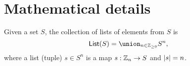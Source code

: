 \documentclass[../notebook.tex]{subfiles}
\begin{document}
\section{Mathematical details}

\begin{defn}[Lists]\label{def:lists}
  Given a set $S$, the collection of lists of elements from $S$ is
  \[
    \lists(S)
    = \union_{n \in \ZZ_{\ge 0}} S^n,
  \]
  where a list (tuple) $s \in S^n$ is a map $s:\mathbb{Z}_n \to S$ and $\abs{s} = n$.
\end{defn}
\end{document}
